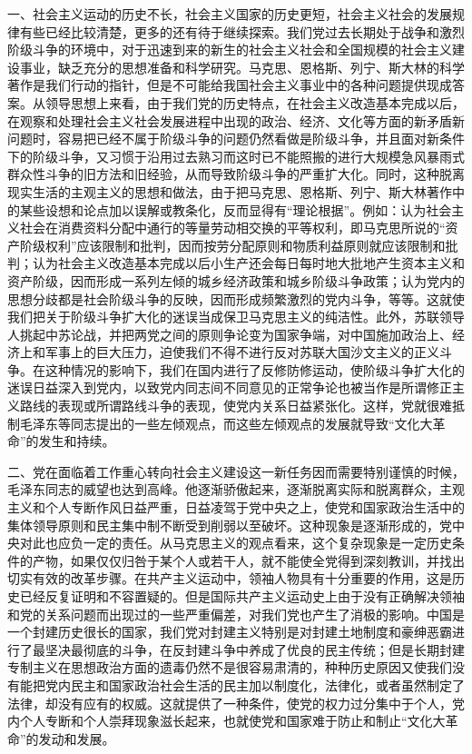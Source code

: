 一、社会主义运动的历史不长，社会主义国家的历史更短，社会主义社会的发展规律有些已经比较清楚，更多的还有待于继续探索。我们党过去长期处于战争和激烈阶级斗争的环境中，对于迅速到来的新生的社会主义社会和全国规模的社会主义建设事业，缺乏充分的思想准备和科学研究。马克思、恩格斯、列宁、斯大林的科学著作是我们行动的指针，但是不可能给我国社会主义事业中的各种问题提供现成答案。从领导思想上来看，由于我们党的历史特点，在社会主义改造基本完成以后，在观察和处理社会主义社会发展进程中出现的政治、经济、文化等方面的新矛盾新问题时，容易把已经不属于阶级斗争的问题仍然看做是阶级斗争，并且面对新条件下的阶级斗争，又习惯于沿用过去熟习而这时已不能照搬的进行大规模急风暴雨式群众性斗争的旧方法和旧经验，从而导致阶级斗争的严重扩大化。同时，这种脱离现实生活的主观主义的思想和做法，由于把马克思、恩格斯、列宁、斯大林著作中的某些设想和论点加以误解或教条化，反而显得有“理论根据”。例如：认为社会主义社会在消费资料分配中通行的等量劳动相交换的平等权利，即马克思所说的“资产阶级权利”应该限制和批判，因而按劳分配原则和物质利益原则就应该限制和批判；认为社会主义改造基本完成以后小生产还会每日每时地大批地产生资本主义和资产阶级，因而形成一系列左倾的城乡经济政策和城乡阶级斗争政策；认为党内的思想分歧都是社会阶级斗争的反映，因而形成频繁激烈的党内斗争，等等。这就使我们把关于阶级斗争扩大化的迷误当成保卫马克思主义的纯洁性。此外，苏联领导人挑起中苏论战，并把两党之间的原则争论变为国家争端，对中国施加政治上、经济上和军事上的巨大压力，迫使我们不得不进行反对苏联大国沙文主义的正义斗争。在这种情况的影响下，我们在国内进行了反修防修运动，使阶级斗争扩大化的迷误日益深入到党内，以致党内同志间不同意见的正常争论也被当作是所谓修正主义路线的表现或所谓路线斗争的表现，使党内关系日益紧张化。这样，党就很难抵制毛泽东等同志提出的一些左倾观点，而这些左倾观点的发展就导致“文化大革命”的发生和持续。

二、党在面临着工作重心转向社会主义建设这一新任务因而需要特别谨慎的时候，毛泽东同志的威望也达到高峰。他逐渐骄傲起来，逐渐脱离实际和脱离群众，主观主义和个人专断作风日益严重，日益凌驾于党中央之上，使党和国家政治生活中的集体领导原则和民主集中制不断受到削弱以至破坏。这种现象是逐渐形成的，党中央对此也应负一定的责任。从马克思主义的观点看来，这个复杂现象是一定历史条件的产物，如果仅仅归咎于某个人或若干人，就不能使全党得到深刻教训，并找出切实有效的改革步骤。在共产主义运动中，领袖人物具有十分重要的作用，这是历史已经反复证明和不容置疑的。但是国际共产主义运动史上由于没有正确解决领袖和党的关系问题而出现过的一些严重偏差，对我们党也产生了消极的影响。中国是一个封建历史很长的国家，我们党对封建主义特别是对封建土地制度和豪绅恶霸进行了最坚决最彻底的斗争，在反封建斗争中养成了优良的民主传统；但是长期封建专制主义在思想政治方面的遗毒仍然不是很容易肃清的，种种历史原因又使我们没有能把党内民主和国家政治社会生活的民主加以制度化，法律化，或者虽然制定了法律，却没有应有的权威。这就提供了一种条件，使党的权力过分集中于个人，党内个人专断和个人崇拜现象滋长起来，也就使党和国家难于防止和制止“文化大革命”的发动和发展。

